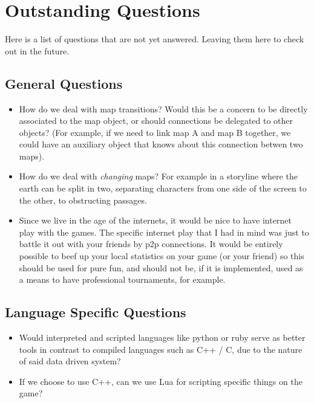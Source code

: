 \section{Outstanding Questions} 

Here is a list of questions that are not yet answered. Leaving them here to 
check out in the future. 

\subsection{General Questions}

\begin{itemize}
\item How do we deal with map transitions? Would this be a concern to be
directly associated to the map object, or should connections be delegated to
other objects? (For example, if we need to link map A and map B together, we
could have an auxiliary object that knows about this connection betwen two
maps).

\item How do we deal with \textit{changing} maps? For example in a storyline
where the earth can be split in two, separating characters from one side of the
screen to the other, to obstructing passages.

\item Since we live in the age of the internets, it would be nice to have 
internet play with the games. The specific internet play that I had in mind was
just to battle it out with your friends by p2p connections. It would be
entirely possible to beef up your local statistics on your game (or your
friend) so this should be used for pure fun, and should not be, if it is
implemented, used as a means to have professional tournaments, for example.
  
\end{itemize} 

\subsection{Language Specific Questions} 

\begin{itemize}

\item Would interpreted and scripted languages like python or ruby serve as
better tools in contrast to compiled languages such as C++ / C, due to the 
nature of said data driven system?

\item If we choose to use C++, can we use Lua for scripting specific things on
the game?


\end{itemize}

